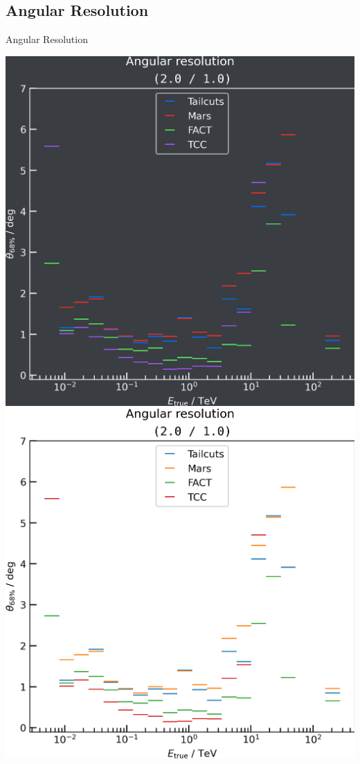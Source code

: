 \subsection{Angular Resolution}
\begin{frame}[label=ang_res]{Angular Resolution}
  \begin{minipage}{0.32\textwidth}
    \ifdefined\darktheme
      \centering
      \includegraphics[width=\textwidth]{plots/ang_res/ang_res_2.0_1.0_dark.png}
    \else
      \includegraphics[width=\textwidth]{plots/ang_res/ang_res_2.0_1.0_light.png}

\end{minipage}
\end{frame}
